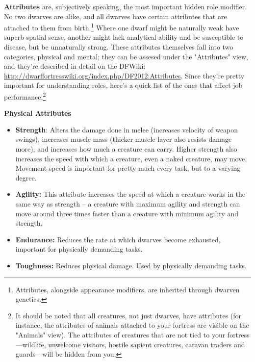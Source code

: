 \documentclass[]{article}
\begin{document}
\textbf{Attributes} are, subjectively speaking, the most important hidden role modifier. No two
dwarves are alike, and all dwarves have certain attributes that are attached to them from
birth.\footnote{Attributes, alongside appearance modifiers, are inherited through dwarven genetics.}
Where one dwarf might be naturally weak have superb spatial sense, another might lack analytical
ability and be susceptible to disease, but be unnaturally strong. These attributes themselves fall into
two categories, physical and mental; they can be assesed under the "Attributes" view, and they're
described in detail on the DFWiki: \url{http://dwarffortresswiki.org/index.php/DF2012:Attributes}. Since
they're pretty important for understanding roles, here's a quick list of the ones that affect job
performance:\footnote{It should be noted that all creatures, not just dwarves, have attributes (for
instance, the attributes of animals attached to your fortress are visible on the "Animals" view). The
attributes of creatures that are not tied to your fortress---wildlife, unwelcome visitors, hostile
sapient creatures, caravan traders and guards---will be hidden from you.}
\vspace{12pt}

\textbf{Physical Attributes}
\begin{itemize}[itemsep=1mm] \item \textbf{Strength}: Alters the damage done in melee (increases velocity
of weapon swings), increases muscle mass (thicker muscle layer also resists damage more), and increases
how much a creature can carry. Higher strength also increases the speed with which a creature, even a
naked creature, may move. Movement speed is important for pretty much every task, but to a varying
degree.

\item \textbf{Agility:} This attribute increases the speed at which a creature works in the same way as
strength -- a creature with maximum agility and strength can move around three times faster than a
creature with minimum agility and strength.

\item \textbf{Endurance:} Reduces the rate at which dwarves become exhausted, important for physically
demanding tasks.

\item \textbf{Toughness:} Reduces physical damage. Used by physically demanding tasks.

\end{itemize}
\end{document}
